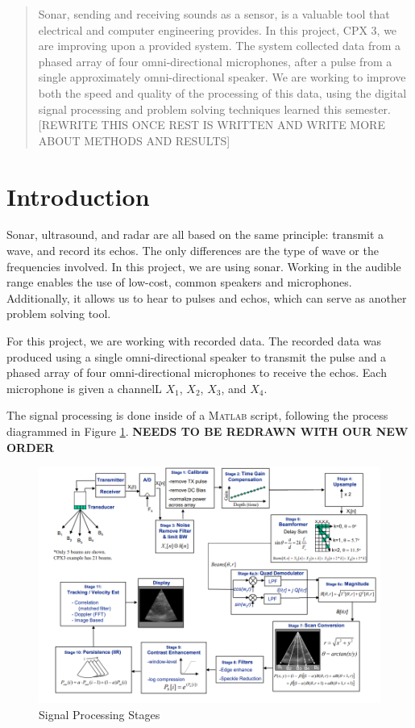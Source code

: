 

\begin{abstract}

Sonar, sending and receiving sounds as a sensor, is a valuable tool that electrical and computer engineering provides.  In this project, CPX 3, we are improving upon a provided system.  The system collected data from a phased array of four omni-directional microphones, after a pulse from a single approximately omni-directional speaker.  We are working to improve both the speed and quality of the processing of this data, using the digital signal processing and problem solving techniques learned this semester. [REWRITE THIS ONCE REST IS WRITTEN AND WRITE MORE ABOUT METHODS AND RESULTS]


\end{abstract}

\section{Introduction}

Sonar, ultrasound, and radar are all based on the same principle: transmit a wave, and record its echos.  The only differences are the type of wave or the frequencies involved.  In this project, we are using sonar.  Working in the audible range enables the use of low-cost, common speakers and microphones.  Additionally, it allows us to hear to pulses and echos, which can serve as another problem solving tool.

For this project, we are working with recorded data.  The recorded data was produced using a single omni-directional speaker to transmit the pulse and a phased array of four omni-directional microphones to receive the echos.  Each microphone is given a channelL $X_1$, $X_2$, $X_3$, and $X_4$.

The signal processing is done inside of a \textsc{Matlab} script, following the process diagrammed in Figure \ref{fig:stages}. \textbf{NEEDS TO BE REDRAWN WITH OUR NEW ORDER}

\begin{figure}[H]
    \centering
    \includegraphics[width=0.75\linewidth]{figures/stages.png}
    \caption{Signal Processing Stages}
    \label{fig:stages}
\end{figure}
